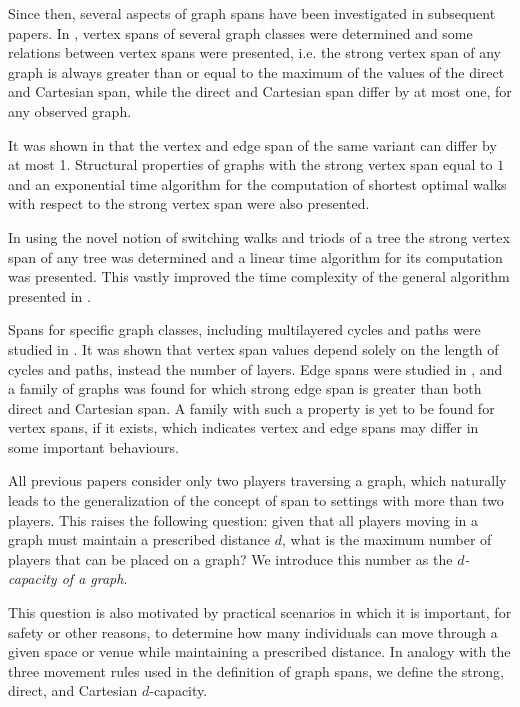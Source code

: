 \documentclass{article}
\begin{document}
Since then, several aspects of graph spans have been investigated in subsequent papers. 
In \cite{Erceg23}, vertex spans of several graph classes were determined and some relations between vertex spans were presented, i.e. the strong vertex span of any graph is always greater than or equal to the maximum of the values of the direct and Cartesian span, while the direct and Cartesian span differ by at most one, for any observed graph.

It was shown in \cite{DrMiTa25} that the vertex and edge span of the same variant can differ by at most 1. Structural properties of graphs with the strong vertex span equal to $1$ and an exponential time algorithm for the computation of shortest optimal walks with respect to the strong vertex span were also presented.

In \cite{GrMoTa25} using the novel notion of switching walks and triods of a tree the strong vertex span of any tree was determined and a linear time algorithm for its computation was presented. This vastly improved the time complexity of the general algorithm presented in \cite{BaTa23}.

Spans for specific graph classes, including multilayered cycles and paths were studied in \cite{SuVo24}. It was shown that vertex span values depend solely on the length of cycles and paths, instead the number of layers.  
Edge spans were studied in \cite{SuVo25}, and a family of graphs was found for which strong edge span is greater than both direct and Cartesian span. A family with such a property is yet to be found for vertex spans, if it exists, which indicates vertex and edge spans may differ in some important behaviours.

All previous papers consider only two players traversing a graph, which naturally leads to the generalization of the concept of span to settings with more than two players. 
This raises the following question: given that all players moving in a graph must maintain a prescribed distance $d$, what is the maximum number of players that can be placed on a graph? We introduce this number as the \emph{$d$-capacity of a graph}.

This question is also motivated by practical scenarios in which it is important, for safety or other reasons, to determine how many individuals can move through a given space or venue while maintaining a prescribed distance. In analogy with the three movement rules used in the definition of graph spans, we define the strong, direct, and Cartesian $d$-capacity.
\end{document}
